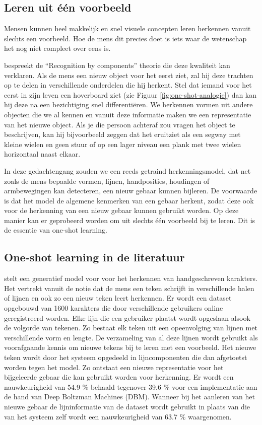 \subsection{Leren uit \'e\'en voorbeeld}
Mensen kunnen heel makkelijk en snel visuele concepten leren herkennen vanuit slechts een voorbeeld. Hoe de mens dit precies doet is iets waar de wetenschap het nog niet compleet over eens is.

\npar \cite{recognition-components} bespreekt de ``Recognition by components'' theorie  die deze kwaliteit kan verklaren. Als de mens een nieuw object voor het eerst ziet, zal hij deze trachten op te delen in verschillende onderdelen die hij herkent. Stel dat iemand voor het eerst in zijn leven een hoverboard ziet (zie Figuur \ref{fig:one-shot-analogie}) dan kan hij deze na een bezichtiging snel differenti\"eren. We herkennen vormen uit andere objecten die we al kennen en vanuit deze informatie maken we een representatie van het nieuwe object. Als je die persoon achteraf zou vragen het object te beschrijven, kan hij bijvoorbeeld zeggen dat het eruitziet als een segway met kleine wielen en geen stuur of op een lager niveau een plank met twee wielen horizontaal naast elkaar.

\npar In deze gedachtengang zouden we een reeds getraind herkenningsmodel, dat net zoals de mens bepaalde vormen, lijnen, handposities, houdingen of armbewegingen kan detecteren, een nieuw gebaar kunnen bijleren. De voorwaarde is dat het model de algemene kenmerken van een gebaar herkent, zodat deze ook voor de herkenning van een nieuw gebaar kunnen gebruikt worden. Op deze manier kan er geprobeerd worden om uit slechts \'e\'en voorbeeld bij te leren. Dit is de essentie van one-shot learning. 

\subsection{One-shot learning in de literatuur}
\npar \cite{oneshot-vis-concepts} stelt een generatief model voor voor het herkennen van handgeschreven karakters. Het vertrekt vanuit de notie dat de mens een teken schrijft in verschillende halen of lijnen en ook zo een nieuw teken leert herkennen. Er wordt een dataset opgebouwd van 1600 karakters die door verschillende gebruikers online geregistreerd worden. Elke lijn die een gebruiker plaatst wordt opgeslaan alsook de volgorde van tekenen. Zo bestaat elk teken uit een opeenvolging van lijnen met verschillende vorm en lengte. De verzameling van al deze lijnen wordt gebruikt als voorafgaande kennis om nieuwe tekens bij te leren met een voorbeeld. Het nieuwe teken wordt door het systeem opgedeeld in lijncomponenten die dan afgetoetst worden tegen het model. Zo ontstaat een nieuwe representatie voor het bijgeleerde gebaar die kan gebruikt worden voor herkenning. Er wordt een nauwkeurigheid van 54.9 \% behaald tegenover 39.6 \% voor een implementatie aan de hand van Deep Boltzman Machines (DBM). Wanneer bij het aanleren van het nieuwe gebaar de lijninformatie van de dataset wordt gebruikt in plaats van die van het systeem zelf wordt een nauwkeurigheid van 63.7 \% waargenomen.

